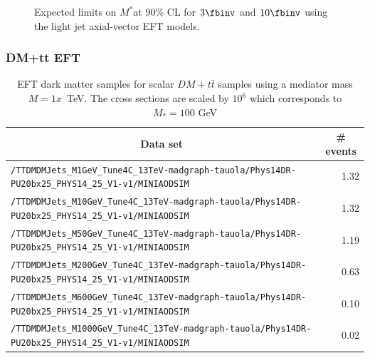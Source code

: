 \begin{figure}[h]
  \centering
  \caption{\label{fig:MJ_EFT_limit} Expected limits on $M^*$at 90\% CL for $3\fbinv$ and $10\fbinv$ using the light jet axial-vector EFT models. }
\end{figure}



\subsubsection{DM+tt EFT}

\begin{table}
    \centering
    \caption{EFT dark matter samples for scalar $DM+t\bar{t}$ samples using a mediator mass $M=1x$~TeV. The cross sections are scaled by $10^6$ which corresponds to $M_*=100$ GeV \label{tab:datasets_dm}}
    \begin{tabular}{lr}
      \hline\hline
      \multicolumn{1}{c}{Data set}&\multicolumn{1}{c}{\# events}\tabularnewline
      \hline
      {\footnotesize \verb!/TTDMDMJets_M1GeV_Tune4C_13TeV-madgraph-tauola/Phys14DR- PU20bx25_PHYS14_25_V1-v1/MINIAODSIM!}   & 1.32 \tabularnewline
      {\footnotesize \verb!/TTDMDMJets_M10GeV_Tune4C_13TeV-madgraph-tauola/Phys14DR- PU20bx25_PHYS14_25_V1-v1/MINIAODSIM!}  & 1.32 \tabularnewline
      {\footnotesize \verb!/TTDMDMJets_M50GeV_Tune4C_13TeV-madgraph-tauola/Phys14DR- PU20bx25_PHYS14_25_V1-v1/MINIAODSIM!}  & 1.19 \tabularnewline
      {\footnotesize \verb!/TTDMDMJets_M200GeV_Tune4C_13TeV-madgraph-tauola/Phys14DR- PU20bx25_PHYS14_25_V1-v1/MINIAODSIM!} & 0.63 \tabularnewline
      {\footnotesize \verb!/TTDMDMJets_M600GeV_Tune4C_13TeV-madgraph-tauola/Phys14DR- PU20bx25_PHYS14_25_V1-v1/MINIAODSIM!} & 0.10 \tabularnewline
      {\footnotesize \verb!/TTDMDMJets_M1000GeV_Tune4C_13TeV-madgraph-tauola/Phys14DR- PU20bx25_PHYS14_25_V1-v1/MINIAODSIM!}& 0.02 \tabularnewline
      \hline \hline
\end{tabular}
\end{table}


